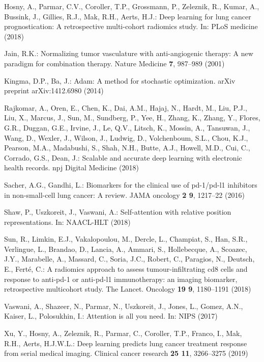 \documentclass[runningheads]{llncs}
\begin{document}
\begin{thebibliography}{10}
Hosny, A., Parmar, C.V., Coroller, T.P., Grossmann, P., Zeleznik, R., Kumar,
  A., Bussink, J., Gillies, R.J., Mak, R.H., Aerts, H.J.: Deep learning for
  lung cancer prognostication: A retrospective multi-cohort radiomics study.
  In: PLoS medicine (2018)

Jain, R.K.: Normalizing tumor vasculature with anti-angiogenic therapy: A new
  paradigm for combination therapy. Nature Medicine  \textbf{7},  987--989
  (2001)

Kingma, D.P., Ba, J.: Adam: A method for stochastic optimization. arXiv
  preprint arXiv:1412.6980  (2014)

Rajkomar, A., Oren, E., Chen, K., Dai, A.M., Hajaj, N., Hardt, M., Liu, P.J.,
  Liu, X., Marcus, J., Sun, M., Sundberg, P., Yee, H., Zhang, K., Zhang, Y.,
  Flores, G.R., Duggan, G.E., Irvine, J., Le, Q.V., Litsch, K., Mossin, A.,
  Tansuwan, J., Wang, D., Wexler, J., Wilson, J., Ludwig, D., Volchenboum,
  S.L., Chou, K.J., Pearson, M.A., Madabushi, S., Shah, N.H., Butte, A.J.,
  Howell, M.D., Cui, C., Corrado, G.S., Dean, J.: Scalable and accurate deep
  learning with electronic health records. npj Digital Medicine  (2018)

Sacher, A.G., Gandhi, L.: Biomarkers for the clinical use of pd-1/pd-l1
  inhibitors in non-small-cell lung cancer: A review. JAMA oncology  \textbf{2
  9},  1217--22 (2016)

Shaw, P., Uszkoreit, J., Vaswani, A.: Self-attention with relative position
  representations. In: NAACL-HLT (2018)

Sun, R., Limkin, E.J., Vakalopoulou, M., Dercle, L., Champiat, S., Han, S.R.,
  Verlingue, L., Brandao, D., Lancia, A., Ammari, S., Hollebecque, A., Scoazec,
  J.Y., Marabelle, A., Massard, C., Soria, J.C., Robert, C., Paragios, N.,
  Deutsch, E., Fert{\'e}, C.: A radiomics approach to assess
  tumour-infiltrating cd8 cells and response to anti-pd-1 or anti-pd-l1
  immunotherapy: an imaging biomarker, retrospective multicohort study. The
  Lancet. Oncology  \textbf{19 9},  1180--1191 (2018)

Vaswani, A., Shazeer, N., Parmar, N., Uszkoreit, J., Jones, L., Gomez, A.N.,
  Kaiser, L., Polosukhin, I.: Attention is all you need. In: NIPS (2017)

Xu, Y., Hosny, A., Zeleznik, R., Parmar, C., Coroller, T.P., Franco, I., Mak,
  R.H., Aerts, H.J.W.L.: Deep learning predicts lung cancer treatment response
  from serial medical imaging. Clinical cancer research  \textbf{25 11},
  3266--3275 (2019)


\end{thebibliography}
\end{document}
